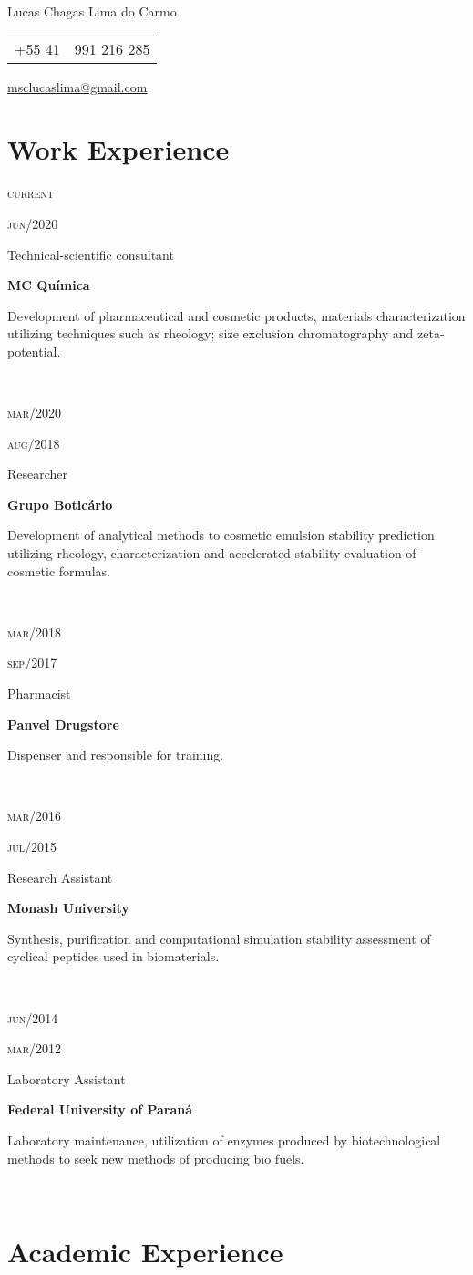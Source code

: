 \documentclass[a4paper, 12pt]{article}
\newcommand{\entry}[5]{
	\begin{minipage}[t]{.1\textwidth}
		\begin{flushright}
			\hfill
			{\textsc{#1}}

			{\textsc{#2}}
		\end{flushright}
	\end{minipage}
	\hfill\textcolor{Sepia}{\vline}\hfill
	\begin{minipage}[t]{.80\textwidth}

		#3
		
		\textcolor{Sepia}{\textbf{#4}}
		
		\footnotesize{#5}

	\end{minipage} \\ \vspace{.5cm}

}
\begin{document}

\pagestyle{fancy} %
\fancyhf{} 
\renewcommand{\headrulewidth}{0pt}

\thispagestyle{empty}
\begin{center}
	{\huge Lucas Chagas Lima do Carmo}
	
	\vspace{6pt}
	
	\begin{tabular}{c|l}
		\arrayrulecolor{Sepia}
		+55 41 & 991 216 285
	\end{tabular}
	
	\vspace{6pt}
	
	\textcolor{Sepia}{\underline{\href{mailto:msclucaslima@gmail.com}{msclucaslima@gmail.com}}}
	
	\vspace{12pt}
\end{center}





\section{Work Experience}

\entry{current}{jun/2020}
{Technical-scientific consultant}
{MC Química}
{Development of pharmaceutical and cosmetic products, 
materials characterization utilizing techniques such as rheology;
size exclusion chromatography and zeta-potential.}

\entry{mar/2020}{aug/2018}
{Researcher}
{Grupo Boticário}
{Development of analytical methods to cosmetic emulsion 
stability prediction utilizing rheology,
characterization and accelerated stability evaluation 
of cosmetic formulas.}

\entry{mar/2018}{sep/2017}
{Pharmacist}
{Panvel Drugstore}
{Dispenser and responsible for training.}

\entry{mar/2016}{jul/2015}
{Research Assistant}
{Monash University}
{Synthesis, purification and computational simulation stability assessment
of cyclical peptides used in biomaterials.}

\entry{jun/2014}{mar/2012}
{Laboratory Assistant}
{Federal University of Paraná}
{Laboratory maintenance, 
utilization of enzymes produced by biotechnological methods
to seek new methods of producing bio fuels.}

\section{Academic Experience}
\end{document}
